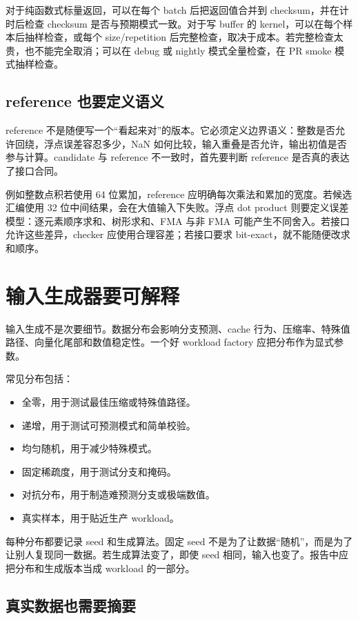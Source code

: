 对于纯函数式标量返回，可以在每个 batch 后把返回值合并到 checksum，并在计时后检查 checksum 是否与预期模式一致。对于写 buffer 的 kernel，可以在每个样本后抽样检查，或每个 size/repetition 后完整检查，取决于成本。若完整检查太贵，也不能完全取消；可以在 debug 或 nightly 模式全量检查，在 PR smoke 模式抽样检查。

\subsection{reference 也要定义语义}

reference 不是随便写一个“看起来对”的版本。它必须定义边界语义：整数是否允许回绕，浮点误差容忍多少，NaN 如何比较，输入重叠是否允许，输出初值是否参与计算。candidate 与 reference 不一致时，首先要判断 reference 是否真的表达了接口合同。

例如整数点积若使用 64 位累加，reference 应明确每次乘法和累加的宽度。若候选汇编使用 32 位中间结果，会在大值输入下失败。浮点 dot product 则要定义误差模型：逐元素顺序求和、树形求和、FMA 与非 FMA 可能产生不同舍入。若接口允许这些差异，checker 应使用合理容差；若接口要求 bit-exact，就不能随便改求和顺序。

\section{输入生成器要可解释}

输入生成不是次要细节。数据分布会影响分支预测、cache 行为、压缩率、特殊值路径、向量化尾部和数值稳定性。一个好 workload factory 应把分布作为显式参数。

常见分布包括：

\begin{itemize}
  \item 全零，用于测试最佳压缩或特殊值路径。
  \item 递增，用于测试可预测模式和简单校验。
  \item 均匀随机，用于减少特殊模式。
  \item 固定稀疏度，用于测试分支和掩码。
  \item 对抗分布，用于制造难预测分支或极端数值。
  \item 真实样本，用于贴近生产 workload。
\end{itemize}

每种分布都要记录 seed 和生成算法。固定 seed 不是为了让数据“随机”，而是为了让别人复现同一数据。若生成算法变了，即使 seed 相同，输入也变了。报告中应把分布和生成版本当成 workload 的一部分。

\subsection{真实数据也需要摘要}


